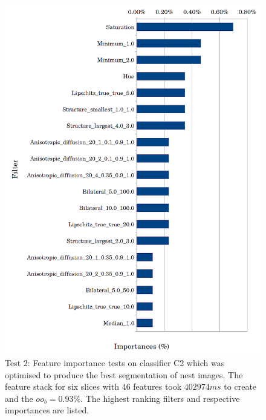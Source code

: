 \begin{figure}[!htbp]\myfloatalign
\includegraphics[width=1\linewidth]{gfx6/features/c2-importances} \caption[Feature importances classifier test 2.]{Test 2: Feature importance tests on classifier C2 which was optimised to produce the best segmentation of nest images. The feature stack for six slices with $ 46 $ features took $ 402974ms $ to create and the $ oo_b=0.93\% $. The highest ranking filters and respective importances are listed.}\label{fig:c2}
\end{figure}

